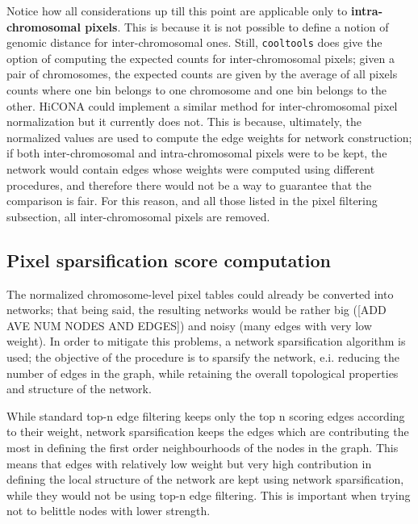 Notice how all considerations up till this point are applicable only to \textbf{intra-chromosomal pixels}. This is because it is not possible to define a notion of genomic distance for inter-chromosomal ones. Still, \texttt{cooltools} does give the option of computing the expected counts for inter-chromosomal pixels; given a pair of chromosomes, the expected counts are given by the average of all pixels counts where one bin belongs to one chromosome and one bin belongs to the other. HiCONA could implement a similar method for inter-chromosomal pixel normalization but it currently does not. This is because, ultimately, the normalized values are used to compute the edge weights for network construction; if both inter-chromosomal and intra-chromosomal pixels were to be kept, the network would contain edges whose weights were computed using different procedures, and therefore there would not be a way to guarantee that the comparison is fair. For this reason, and all those listed in the pixel filtering subsection, all inter-chromosomal pixels are removed.

\subsection{Pixel sparsification score computation}

The normalized chromosome-level pixel tables could already be converted into networks; that being said, the resulting networks would be rather big ([ADD AVE NUM NODES AND EDGES]) and noisy (many edges with very low weight). In order to mitigate this problems, a network sparsification algorithm\cite{sparsification2009} is used; the objective of the procedure is to sparsify the network, e.i. reducing the number of edges in the graph, while retaining the overall topological properties and structure of the network.

While standard top-n edge filtering keeps only the top n scoring edges according to their weight, network sparsification keeps the edges which are contributing the most in defining the first order neighbourhoods of the nodes in the graph. This means that edges with relatively low weight but very high contribution in defining the local structure of the network are kept using network sparsification, while they would not be using top-n edge filtering. This is important when trying not to belittle nodes with lower strength.

